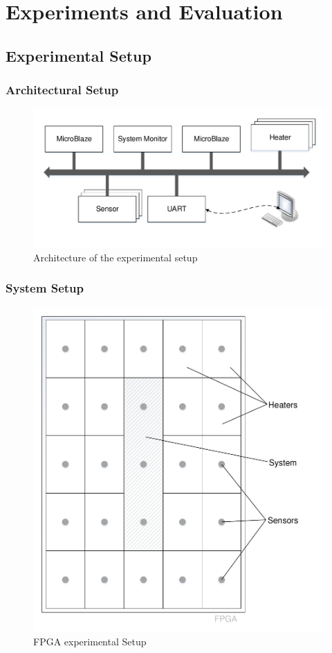  
\chapter{Experiments and Evaluation}
\label{ch:experiments}

\section{Experimental Setup}
\subsection{Architectural Setup}
\begin{figure}[h]
	\includegraphics[width=\textwidth]{__pics/exsetup.pdf}
	\caption{ Architecture of the experimental setup }
	\label{pic:archsetup}	
\end{figure}

\subsection{System Setup}
\begin{figure}[h]
	\includegraphics[width=\textwidth]{__pics/syssetup.pdf}
	\caption{ \ac{FPGA} experimental Setup}
	\label{pic:syssetup}	
\end{figure}


